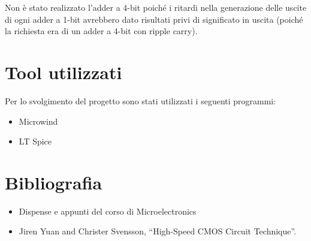 \documentclass[12pt]{article} %
\begin{document}
Non è stato realizzato l'adder a 4-bit poiché i ritardi nella generazione delle uscite di ogni adder a 1-bit avrebbero dato risultati privi di significato in uscita (poiché la richiesta era di un adder a 4-bit con ripple carry).

\section{Tool utilizzati}
Per lo svolgimento del progetto sono stati utilizzati i seguenti programmi:
\begin{itemize}
\item Microwind
\item LT Spice
\end{itemize}


\section{Bibliografia}
\begin{itemize}
\item Dispense e appunti del corso di Microelectronics
\item Jiren Yuan and Christer Svensson, “High-Speed CMOS Circuit Technique”.
\end{itemize}
\end{document}
